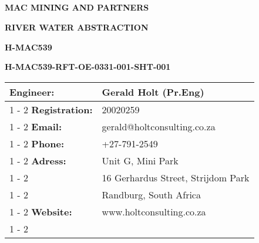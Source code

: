 \documentclass{article}%
\begin{document}
%
\pagestyle{empty}%
\normalsize%
\pagestyle{header}%
\begin{center}%
\section*{}%
\label{sec:}%
\begin{minipage}{\textwidth}%
\centering%
\begin{Large}%
\textbf{MAC MINING AND PARTNERS}%
\end{Large}%
\vspace*{20pt}%
\linebreak%
\begin{large}%
\textbf{RIVER WATER ABSTRACTION}%
\end{large}%
\vspace*{20pt}%
\linebreak%
\begin{large}%
\textbf{H{-}MAC539}%
\end{large}%
\vspace*{20pt}%
\linebreak%
\begin{large}%
\textbf{H{-}MAC539{-}RFT{-}OE{-}0331{-}001{-}SHT{-}001}%
\end{large}%
\vspace*{80pt}%
\end{minipage}

%
\end{center}%
\begin{center}%
\begin{minipage}{\textwidth}%
\flushleft%
\begin{tabular}{|l |l |}%
\hline%
\textbf{Engineer:}&Gerald Holt (Pr.Eng)\\%
\cline{1%
-%
2}%
\textbf{Registration:}&20020259\\%
\cline{1%
-%
2}%
\textbf{Email:}&gerald@holtconsulting.co.za\\%
\cline{1%
-%
2}%
\textbf{Phone:}&+27{-}791{-}2549\\%
\cline{1%
-%
2}%
\textbf{Adress:}&Unit G, Mini Park\\%
\cline{1%
-%
2}%
\textbf{}&16 Gerhardus Street, Strijdom Park\\%
\cline{1%
-%
2}%
\textbf{}&Randburg, South Africa\\%
\cline{1%
-%
2}%
\textbf{Website:}&www.holtconsulting.co.za\\%
\cline{1%
-%
2}%
\end{tabular}%
\vspace*{150pt}%
\centering%
\end{minipage}%
\end{center}%
\end{document}
